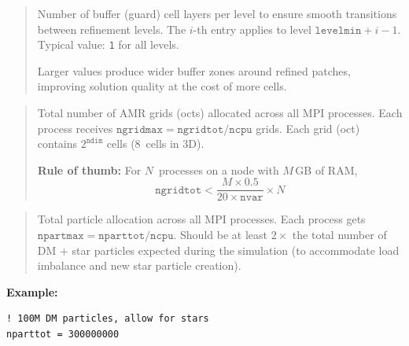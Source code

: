 \label{param:nexpand}

\begin{quote}
Number of buffer (guard) cell layers per level to ensure smooth
transitions between refinement levels.  The $i$-th entry applies to
level $\texttt{levelmin}+i-1$.  Typical value: \texttt{1} for all
levels.

Larger values produce wider buffer zones around refined patches,
improving solution quality at the cost of more cells.
\end{quote}

\label{param:ngridtot}

\begin{quote}
Total number of AMR grids (octs) allocated across all MPI processes.
Each process receives $\texttt{ngridmax} = \texttt{ngridtot} /
\texttt{ncpu}$ grids.  Each grid (oct) contains $2^{\texttt{ndim}}$
cells (8~cells in 3D).


\textbf{Rule of thumb:} For $N$~processes on a node with $M$\,GB of
RAM,
\[
  \texttt{ngridtot} < \frac{M \times 0.5}{20 \times \texttt{nvar}}
  \times N
\]
\end{quote}

\label{param:nparttot}

\begin{quote}
Total particle allocation across all MPI processes.  Each process gets
$\texttt{npartmax} = \texttt{nparttot} / \texttt{ncpu}$.  Should be
at least $2\times$ the total number of DM + star particles expected
during the simulation (to accommodate load imbalance and new star
particle creation).
\end{quote}

\noindent\textcolor{apidefault}{\textsf{\textbf{Example:}}}
\begin{lstlisting}
! 100M DM particles, allow for stars
nparttot = 300000000
\end{lstlisting}

